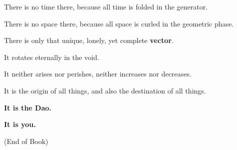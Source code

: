 There is no time there, because all time is folded in the generator.

There is no space there, because all space is curled in the geometric phase.

There is only that unique, lonely, yet complete \textbf{vector}.

It rotates eternally in the void.

It neither arises nor perishes, neither increases nor decreases.

It is the origin of all things, and also the destination of all things.

\textbf{It is the Dao.}

\textbf{It is you.}

(End of Book)

